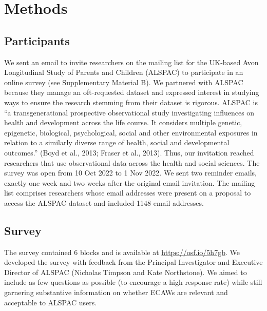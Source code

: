 \documentclass[
  man,floatsintext]{apa6}
\begin{document}
\hypertarget{methods}{%
\section{Methods}\label{methods}}

\hypertarget{participants}{%
\subsection{Participants}\label{participants}}

We sent an email to invite researchers on the mailing list for the UK-based Avon Longitudinal Study of Parents and Children (ALSPAC) to participate in an online survey (see Supplementary Material B). We partnered with ALSPAC because they manage an oft-requested dataset and expressed interest in studying ways to ensure the research stemming from their dataset is rigorous. ALSPAC is ``a transgenerational prospective observational study investigating influences on health and development across the life course. It considers multiple genetic, epigenetic, biological, psychological, social and other environmental exposures in relation to a similarly diverse range of health, social and developmental outcomes.'' (Boyd et al., 2013; Fraser et al., 2013). Thus, our invitation reached researchers that use observational data across the health and social sciences. The survey was open from 10 Oct 2022 to 1 Nov 2022. We sent two reminder emails, exactly one week and two weeks after the original email invitation. The mailing list comprises researchers whose email addresses were present on a proposal to access the ALSPAC dataset and included 1148 email addresses.

\hypertarget{survey}{%
\subsection{Survey}\label{survey}}

The survey contained 6 blocks and is available at \url{https://osf.io/5h7gb}. We developed the survey with feedback from the Principal Investigator and Executive Director of ALSPAC (Nicholas Timpson and Kate Northstone). We aimed to include as few questions as possible (to encourage a high response rate) while still garnering substantive information on whether ECAWs are relevant and acceptable to ALSPAC users.
\end{document}
